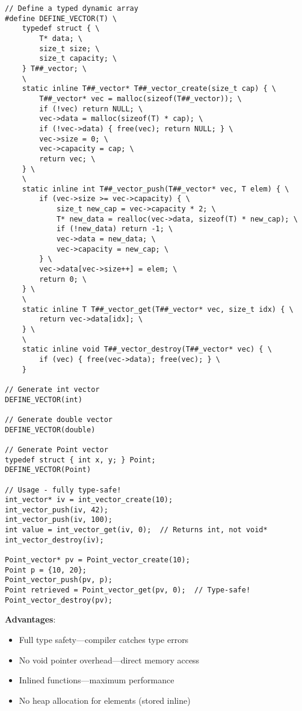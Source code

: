 \begin{lstlisting}
// Define a typed dynamic array
#define DEFINE_VECTOR(T) \
    typedef struct { \
        T* data; \
        size_t size; \
        size_t capacity; \
    } T##_vector; \
    \
    static inline T##_vector* T##_vector_create(size_t cap) { \
        T##_vector* vec = malloc(sizeof(T##_vector)); \
        if (!vec) return NULL; \
        vec->data = malloc(sizeof(T) * cap); \
        if (!vec->data) { free(vec); return NULL; } \
        vec->size = 0; \
        vec->capacity = cap; \
        return vec; \
    } \
    \
    static inline int T##_vector_push(T##_vector* vec, T elem) { \
        if (vec->size >= vec->capacity) { \
            size_t new_cap = vec->capacity * 2; \
            T* new_data = realloc(vec->data, sizeof(T) * new_cap); \
            if (!new_data) return -1; \
            vec->data = new_data; \
            vec->capacity = new_cap; \
        } \
        vec->data[vec->size++] = elem; \
        return 0; \
    } \
    \
    static inline T T##_vector_get(T##_vector* vec, size_t idx) { \
        return vec->data[idx]; \
    } \
    \
    static inline void T##_vector_destroy(T##_vector* vec) { \
        if (vec) { free(vec->data); free(vec); } \
    }

// Generate int vector
DEFINE_VECTOR(int)

// Generate double vector
DEFINE_VECTOR(double)

// Generate Point vector
typedef struct { int x, y; } Point;
DEFINE_VECTOR(Point)

// Usage - fully type-safe!
int_vector* iv = int_vector_create(10);
int_vector_push(iv, 42);
int_vector_push(iv, 100);
int value = int_vector_get(iv, 0);  // Returns int, not void*
int_vector_destroy(iv);

Point_vector* pv = Point_vector_create(10);
Point p = {10, 20};
Point_vector_push(pv, p);
Point retrieved = Point_vector_get(pv, 0);  // Type-safe!
Point_vector_destroy(pv);
\end{lstlisting}

\textbf{Advantages}:
\begin{itemize}
    \item Full type safety---compiler catches type errors
    \item No void pointer overhead---direct memory access
    \item Inlined functions---maximum performance
    \item No heap allocation for elements (stored inline)
\end{itemize}

